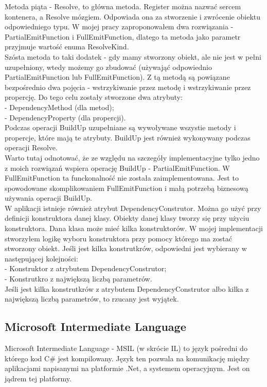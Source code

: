 \documentclass[12pt]{article}
\begin{document}
Metoda piąta - Resolve, to główna metoda. Register można nazwać sercem kontenera, a Resolve mózgiem. Odpowiada ona za stworzenie i zwrócenie obiektu odpowiedniego typu. W mojej pracy zaproponowałem dwa rozwiązania - PartialEmitFunction i FullEmitFunction, dlatego ta metoda jako parametr przyjmuje wartość enuma ResolveKind.\\
Szósta metoda to taki dodatek - gdy mamy stworzony obiekt, ale nie jest w pełni uzupełniony, wtedy możemy go zbudować (używająć odpowiednio PartialEmitFunction lub FullEmitFunction). Z tą metodą są powiązane bezpośrednio dwa pojęcia - wstrzykiwanie przez metodę i wstrzykiwanie przez propercję. Do tego celu zostały stworzone dwa atrybuty:\\
- DependencyMethod (dla metod);\\
- DependencyProperty (dla propercji).\\
Podczas operacji BuildUp uzupełniane są wywoływane wszystie metody i propercje, które mają te atrybuty. BuildUp jest również wykonywany podczas operacji Resolve.\\
Warto tutaj odnotować, że ze względu na szczegóły implementacyjne tylko jedno z moich rozwiązań wspiera operację BuildUp - PartialEmitFunction. W FullEmitFunction ta funckonalność nie została zaimplementowana. Jest to spowodowane skomplikowaniem FullEmitFunction i małą potrzebą biznesową używania operacji BuildUp.\\

W aplikacji istnieje również atrybut DependencyConstrutor. Można go użyć przy definicji konstruktora danej klasy. Obiekty danej klasy tworzy się przy użyciu konstruktora. Dana klasa może mieć kilka konstruktorów. W mojej implementacji stworzyłem logikę wyboru konstruktora przy pomocy którego ma zostać stworzony obiekt. Jeśli jest kilka konstrutkrów, odpowiedni jest wybierany w następującej kolejności:\\
- Konstruktor z atrybutem DependencyConstrutor;\\
- Konstrutkro z największą liczbą parametrów.\\
Jeśli jest kilka konstrutkrów z atrybutem DependencyConstrutor albo kilka z największą liczbą parametrów, to rzucany jest wyjątek.\\


\subsection{Microsoft Intermediate Language}
Microsoft Intermediate Language - MSIL (w skrócie IL) to język pośredni do którego kod C\# jest kompilowany. Język ten pozwala na komunikację między aplikacjami napisanymi na platformie .Net, a systemem operacyjnym. Jest on jądrem tej platformy.
\end{document}
